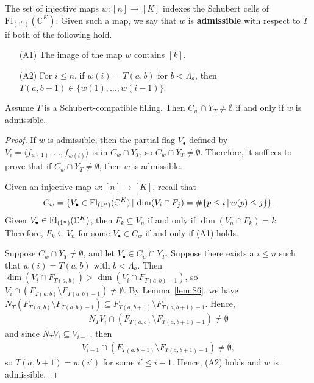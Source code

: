 \documentclass[12pt]{amsart}
\newcommand{\st}{\,|\,}
\newcommand{\Fl}{\mathrm{Fl}}
\begin{document}


The set of injective maps $w:[n]\rightarrow [K]$ indexes the Schubert cells of $\Fl_{(1^n)}(\mathbb{C}^K)$.
Given such a map, we say that $w$ is {\bf admissible} with respect to $T$ if both of the following hold.
\begin{itemize}
    \item[(A1)] The image of the map $w$ contains $[k]$.%
    \item[(A2)] For $i\leq n$, if $w(i)=T(a,b)$ for $b<\Lambda_a$, then $T(a,b+1)\in \{w(1),\dots, w(i-1)\}$. 
\end{itemize}

\begin{lemma}\label{lem:NonemptyIntersections}
Assume $T$ is a Schubert-compatible filling.  Then  $C_w\cap Y_{T}\neq\emptyset$ if and only if $w$ is admissible.
\end{lemma}



\begin{proof}
If $w$ is admissible, then the partial flag $V_\bullet$ defined by $V_i=\langle f_{w(1)}, \ldots, f_{w(i)}\rangle$ is in $C_w\cap Y_{T}$, so $C_w\cap Y_{T} \neq \emptyset$. Therefore, it suffices to prove that if $C_w\cap Y_{T}\neq\emptyset$, then $w$ is admissible.

Given an injective map $w: [n]\to [K]$, recall that 
\begin{align}
    C_w = \{V_\bullet \in \Fl_{(1^n)}(\bC^K) \st \dim(V_i\cap F_j) = \#\{p\leq i \st w(p)\leq j\}\}.
\end{align}
Given $V_\bullet\in \Fl_{(1^n)}(\bC^K)$, then $F_k\subseteq V_n$ if and only if $\dim(V_n\cap F_k) = k$. Therefore, $F_k\subseteq V_n$ for some $V_\bullet\in C_w$ if and only if (A1) holds.

Suppose $C_w\cap Y_{T}\neq\emptyset$, and let $V_\bullet \in C_w\cap Y_{T}$. Suppose there exists a $i\leq n$ such that $w(i) = T(a,b)$ with $b<\Lambda_a$.
Then $\dim(V_i\cap F_{T(a,b)})>\dim(V_i\cap F_{T(a,b)-1})$, so $V_i\cap (F_{T(a,b)}\setminus F_{T(a,b)-1})\neq\emptyset$.  By Lemma~\ref{lem:S6}, we have $N_T (F_{T(a,b)}\setminus F_{T(a,b)-1}) \subseteq F_{T(a,b+1)}\setminus F_{T(a,b+1)-1}$. Hence,
\begin{align}
    N_T V_i \cap (F_{T(a,b)} \setminus F_{T(a,b+1)-1}) \neq \emptyset
\end{align}
and since $N_T V_i\subseteq V_{i-1}$, then
\begin{align}
    V_{i-1} \cap (F_{T(a,b+1)}\setminus F_{T(a,b+1)-1}) \neq \emptyset,
\end{align}
so $T(a,b+1)=w(i')$ for some $i'\leq i-1$. Hence, (A2) holds and $w$ is admissible.
\end{proof}
\end{document}
